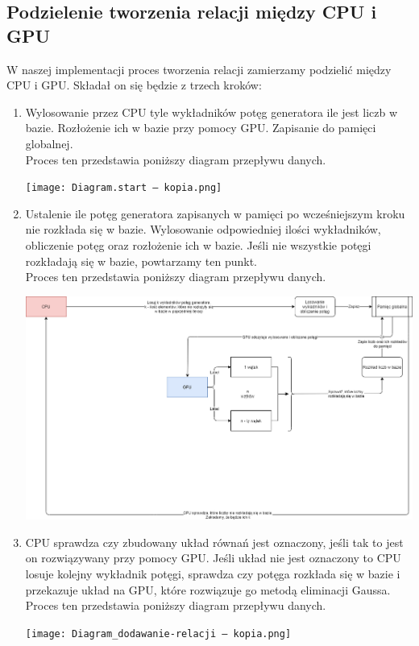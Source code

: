 \documentclass{article}
\begin{document}
\newpage

\subsection{Podzielenie tworzenia relacji między CPU i GPU}

W naszej implementacji proces tworzenia relacji zamierzamy podzielić między CPU i GPU. Składał on się będzie z trzech kroków:
\begin{enumerate}
    \item Wylosowanie przez CPU tyle wykładników potęg generatora ile jest liczb w bazie. Rozłożenie ich w bazie przy pomocy GPU. Zapisanie do pamięci globalnej.\\
    Proces ten przedstawia poniższy diagram przepływu danych.
    \begin{center}
    \texttt{[image: Diagram.start — kopia.png]}
    \end{center}
    \item Ustalenie ile potęg generatora zapisanych w pamięci po wcześniejszym kroku nie rozkłada się w bazie. Wylosowanie odpowiedniej ilości wykładników, obliczenie potęg oraz rozłożenie ich w bazie. Jeśli nie wszystkie potęgi rozkładają się w bazie, powtarzamy ten punkt.\\
    Proces ten przedstawia poniższy diagram przepływu danych.
    \begin{center}
    \includegraphics[width = 15 cm]{Diagram_uzupełnienie_do_n — kopia.png}
    \end{center}
    \newpage
    \item CPU sprawdza czy zbudowany układ równań jest oznaczony, jeśli tak to jest on rozwiązywany przy pomocy GPU. Jeśli układ nie jest oznaczony to CPU losuje kolejny wykładnik potęgi, sprawdza czy potęga rozkłada się w bazie i przekazuje układ na GPU, które rozwiązuje go metodą eliminacji Gaussa.\\
    Proces ten przedstawia poniższy diagram przepływu danych.
    \begin{center}
    \texttt{[image: Diagram\_dodawanie-relacji — kopia.png]}
    \end{center}
\end{enumerate}
\end{document}
